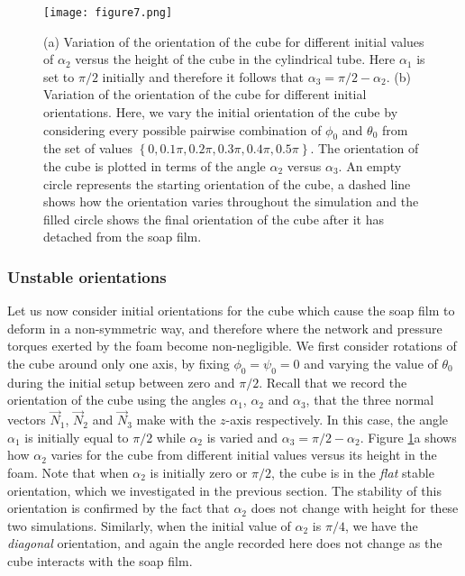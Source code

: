 \documentclass[preprint]{revtex4-1}
\begin{document}
\begin{figure}
    \centering
\texttt{[image: figure7.png]}
		\caption{(a) Variation of the orientation of the cube for different initial values of $\alpha_2$ versus the height of the cube in the cylindrical tube. Here $\alpha_1$ is set to $\pi/2$ initially and therefore it follows that $\alpha_3=\pi/2-\alpha_2$. (b) Variation of the orientation of the cube for different initial orientations. Here, we vary the initial orientation of the cube by considering every possible pairwise combination of $\phi_0$ and $\theta_0$ from the set of values $\left\{0,0.1\pi,0.2\pi,0.3\pi,0.4\pi,0.5\pi\right\}$. The orientation of the cube is plotted in terms of the angle $\alpha_2$ versus $\alpha_3$. An empty circle represents the starting orientation of the cube, a dashed line shows how the orientation varies throughout the simulation and the filled circle shows the final orientation of the cube after it has detached from the soap film.}
			\label{fig:orientation}
	\end{figure}

\subsubsection{Unstable orientations}

Let us now consider initial orientations for the cube which cause the soap film to deform in a non-symmetric way, and therefore where the network and pressure torques exerted by the foam become non-negligible. We first consider rotations of the cube around only one axis, by fixing $\phi_0=\psi_0=0$ and varying the value of $\theta_0$ during the initial setup between zero and $\pi/2$. Recall that we record the orientation of the cube using the angles $\alpha_1$, $\alpha_2$ and $\alpha_3$, that the three normal vectors $\vec{N}_1$, $\vec{N}_2$ and $\vec{N}_3$ make with the $z$-axis  respectively. In this case, the angle $\alpha_1$ is initially equal to $\pi/2$ while $\alpha_2$ is varied and $\alpha_3=\pi/2-\alpha_2$. Figure \ref{fig:orientation}a shows how $\alpha_2$ varies for the cube from different initial values versus its height in the foam. Note that when $\alpha_2$ is initially zero or $\pi/2$, the cube is in the \emph{flat} stable orientation, which we investigated in the previous section. The stability of this orientation is confirmed by the fact that $\alpha_2$ does not change with height for these two simulations. Similarly, when the initial value of $\alpha_2$ is $\pi/4$, we have the \emph{diagonal} orientation, and again the angle recorded here does not change as the cube interacts with the soap film. 
\end{document}
